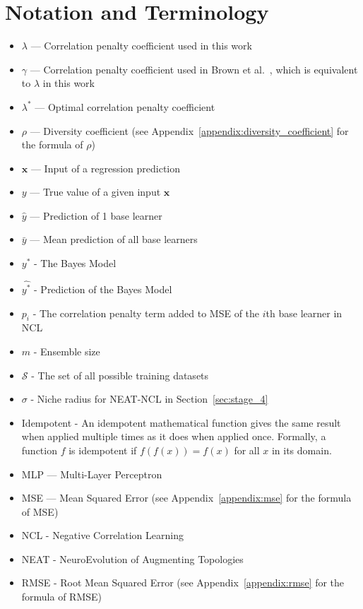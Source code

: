 \documentclass{article}
\begin{document}
\section{Notation and Terminology}
\begin{itemize}
    \item $\lambda$ — Correlation penalty coefficient used in this work
    \item $\gamma$ — Correlation penalty coefficient used in Brown et al.\ \cite{brown2005managing}, which is equivalent to $\lambda$ in this work
    \item $\lambda^*$ — Optimal correlation penalty coefficient
    \item $\rho$ — Diversity coefficient (see Appendix~\ref{appendix:diversity_coefficient} for the formula of $\rho$)
    \item $\mathbf{x}$ — Input of a regression prediction
    \item $y$ — True value of a given input $\mathbf{x}$
    \item $\hat{y}$ — Prediction of 1 base learner
    \item $\bar{y}$ — Mean prediction of all base learners
    \item $y^*$ - The Bayes Model
    \item $\hat{y^*}$ - Prediction of the Bayes Model
    \item $p_i$ - The correlation penalty term added to MSE of the $i$th base learner in NCL
    \item $m$ - Ensemble size
    \item $\mathcal{S}$ - The set of all possible training datasets
    \item $\sigma$ - Niche radius for NEAT-NCL in Section~\ref{sec:stage_4}
    \item Idempotent - An idempotent mathematical function gives the same result when applied multiple times as it does when applied once. Formally, a function $f$ is idempotent if $f(f(x)) = f(x)$ for all $x$ in its domain. 
    \item MLP — Multi-Layer Perceptron
    \item MSE — Mean Squared Error (see Appendix~\ref{appendix:mse} for the formula of MSE)
    \item NCL - Negative Correlation Learning
    \item NEAT - NeuroEvolution of Augmenting Topologies
    \item RMSE - Root Mean Squared Error (see Appendix~\ref{appendix:rmse} for the formula of RMSE)
\end{itemize}
\end{document}
